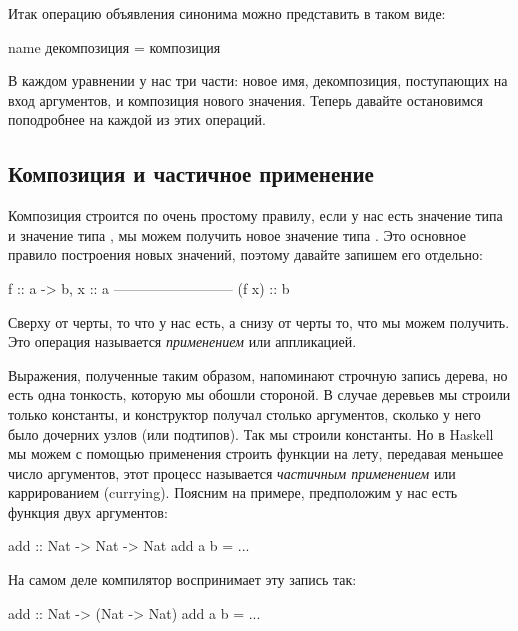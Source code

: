 Итак операцию объявления синонима можно представить в таком виде:

\begin{code}
name    декомпозиция    =  композиция 
\end{code}

В каждом уравнении у нас три части: новое имя, декомпозиция,
поступающих на вход аргументов, и композиция нового значения.
Теперь давайте остановимся поподробнее на каждой из этих операций.

\subsection{Композиция и частичное применение}

Композиция строится по очень простому правилу, если у нас
есть значение  типа  и значение  типа
, мы можем получить новое значение \mbox{} типа
. Это основное правило построения новых значений, поэтому
давайте запишем его отдельно: 

\begin{code}
                    f :: a -> b,       x :: a
                    --------------------------
                            (f x) :: b
\end{code}

Сверху от черты, то что у нас есть, а снизу от черты то, что
мы можем получить. Это операция называется \emph{применением}
или аппликацией. 

Выражения, полученные таким образом, напоминают строчную запись дерева,
но есть одна тонкость, которую мы обошли стороной. В случае деревьев 
мы строили только константы, и конструктор получал столько аргументов,
сколько у него было дочерних узлов (или подтипов). Так мы строили константы. 
Но в Haskell мы можем с помощью применения строить функции на лету, 
передавая меньшее число аргументов, этот процесс называется
\emph{частичным применением} или каррированием (currying). 
Поясним на примере, предположим у нас есть функция двух аргументов:

\begin{code}
add :: Nat -> Nat -> Nat
add a b = ...
\end{code}

На самом деле компилятор воспринимает эту запись так:

\begin{code}
add :: Nat -> (Nat -> Nat)
add a b = ...
\end{code}

